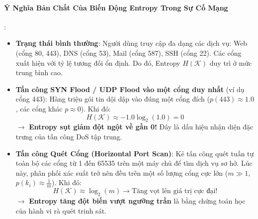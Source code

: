 \paragraph{Ý Nghĩa Bản Chất Của Biến Động Entropy Trong Sự Cố Mạng}:
\begin{itemize}
  \item \textbf{Trạng thái bình thường}: Người dùng truy cập đa dạng các dịch vụ: Web (cổng 80, 443), DNS (cổng 53), Mail (cổng 587), SSH (cổng 22). Các cổng xuất hiện với tỷ lệ tương đối ổn định. Do đó, Entropy $H(\mathcal{K})$ duy trì ở mức trung bình cao.
  \item \textbf{Tấn công SYN Flood / UDP Flood vào một cổng duy nhất} (ví dụ cổng 443): Hàng triệu gói tin dội dập vào đúng một cổng đích ($p(443) \approx 1.0$, các cổng khác $p \approx 0$). Khi đó:
  \begin{equation*}
  H(\mathcal{K}) \approx - 1.0 \log_2(1.0) = 0
  \end{equation*}
  $\rightarrow$ \textbf{Entropy sụt giảm đột ngột về gần 0!} Đây là dấu hiệu nhận diện đặc trưng của tấn công DoS tập trung.
  \item \textbf{Tấn công Quét Cổng (Horizontal Port Scan)}: Kẻ tấn công quét tuần tự toàn bộ các cổng từ 1 đến 65535 trên một máy chủ để tìm dịch vụ sơ hở. Lúc này, phân phối xác suất trở nên đều trên một số lượng cổng cực lớn ($m \gg 1$, $p(k_i) \approx \frac{1}{m}$). Khi đó:
  \begin{equation*}
  H(\mathcal{K}) \approx \log_2(m) \longrightarrow \text{Tăng vọt lên giá trị cực đại!}
  \end{equation*}
  $\rightarrow$ \textbf{Entropy tăng đột biến vượt ngưỡng trần} là bằng chứng toán học của hành vi rà quét trinh sát.
\end{itemize}

